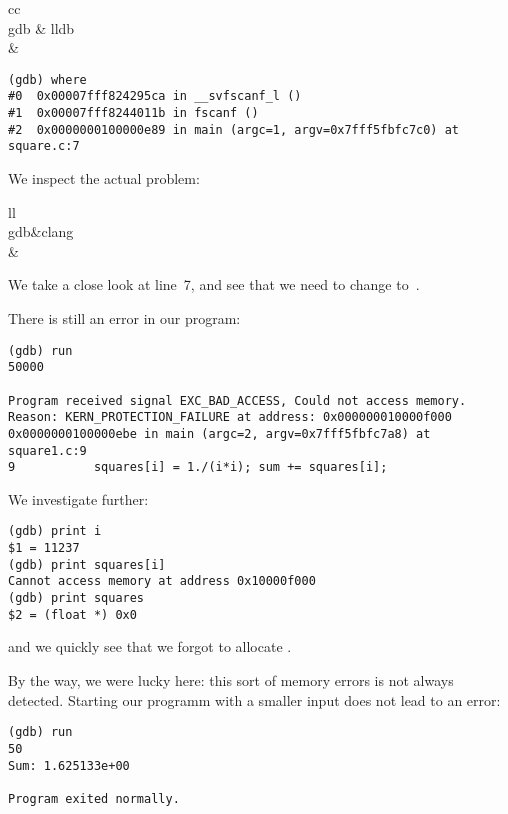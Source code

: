 \begin{fntable}{cc}
   \\
  \midrule
  gdb & lldb\\
  \midrule
  &\\
\end{fntable}

{\small
\begin{verbatim}
(gdb) where
#0  0x00007fff824295ca in __svfscanf_l ()
#1  0x00007fff8244011b in fscanf ()
#2  0x0000000100000e89 in main (argc=1, argv=0x7fff5fbfc7c0) at square.c:7
\end{verbatim}
}

We inspect the actual problem:

  \begin{fntable}{ll}
    \\
    \midrule
    gdb&clang\\
    &\\
  \end{fntable}

We take a close look at line~7, and see that we need to
change  to~.

There is still an error in our program:
{\small
\begin{verbatim}
(gdb) run
50000

Program received signal EXC_BAD_ACCESS, Could not access memory.
Reason: KERN_PROTECTION_FAILURE at address: 0x000000010000f000
0x0000000100000ebe in main (argc=2, argv=0x7fff5fbfc7a8) at square1.c:9
9           squares[i] = 1./(i*i); sum += squares[i];
\end{verbatim}
}
We investigate further:
\begin{verbatim}
(gdb) print i
$1 = 11237
(gdb) print squares[i]
Cannot access memory at address 0x10000f000
(gdb) print squares
$2 = (float *) 0x0
\end{verbatim}
and we quickly see that we forgot to allocate .

By the way, we were lucky here: this sort of memory errors is not always
detected. Starting our programm with a smaller input does not lead to
an error:
\begin{verbatim}
(gdb) run
50
Sum: 1.625133e+00

Program exited normally.
\end{verbatim}

